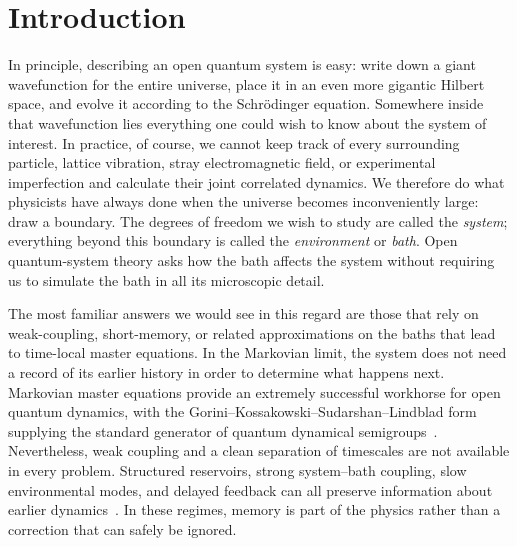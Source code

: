 ﻿\section{Introduction}
\label{sec:intro}
In principle, describing an open quantum system is easy: write down a giant wavefunction for the entire universe, place it in an even more gigantic Hilbert space, and evolve it according to the Schrödinger equation.
Somewhere inside that wavefunction lies everything one could wish to know about the system of interest.
In practice, of course, we cannot keep track of every surrounding particle, lattice vibration, stray electromagnetic field, or experimental imperfection and calculate their joint correlated dynamics.
We therefore do what physicists have always done when the universe becomes inconveniently large: draw a boundary.
The degrees of freedom we wish to study are called the \emph{system}; everything beyond this boundary is called the \emph{environment} or \emph{bath}.
Open quantum-system theory asks how the bath affects the system without requiring us to simulate the bath in all its microscopic detail.

The most familiar answers we would see in this regard are those that rely on weak-coupling, short-memory, or related approximations on the baths that lead to time-local master equations.
In the Markovian limit, the system does not need a record of its earlier history in order to determine what happens next.
Markovian master equations provide an extremely successful workhorse for open quantum dynamics, with the Gorini--Kossakowski--Sudarshan--Lindblad form supplying the standard generator of quantum dynamical semigroups~\cite{Gorini1976,Lindblad1976}.
Nevertheless, weak coupling and a clean separation of timescales are not available in every problem.
Structured reservoirs, strong system--bath coupling, slow environmental modes, and delayed feedback can all preserve information about earlier dynamics~\cite{Rivas2014,deVega2017}.
In these regimes, memory is part of the physics rather than a correction that can safely be ignored.

